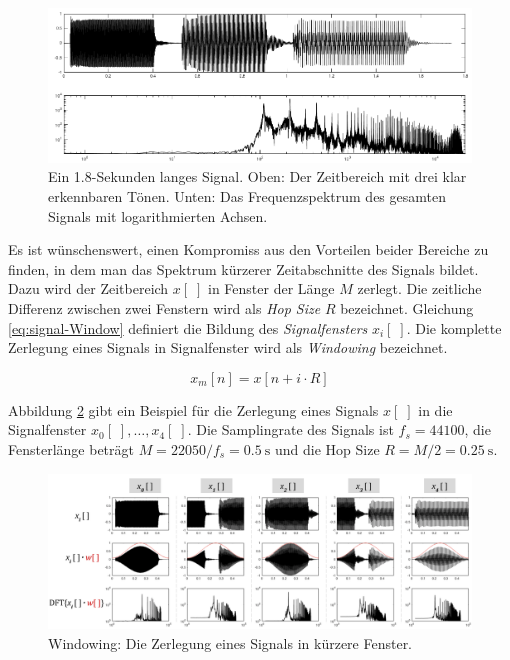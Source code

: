 \begin{figure}[h]
	\centering
	\includegraphics[width=1\textwidth]{bilder/stft01.png}
	\caption[Beispiel für die DFT]{Ein 1.8-Sekunden langes Signal. Oben: Der Zeitbereich mit drei klar erkennbaren Tönen. Unten: Das Frequenzspektrum des gesamten Signals mit logarithmierten Achsen.}
	\label{img:stft01}
\end{figure}

Es ist wünschenswert, einen Kompromiss aus den Vorteilen beider Bereiche zu finden, in dem man das Spektrum kürzerer Zeitabschnitte des Signals bildet. Dazu wird der Zeitbereich $x[\;]$ in Fenster der Länge $M$ zerlegt. Die zeitliche Differenz zwischen zwei Fenstern wird als \emph{Hop Size} $R$ bezeichnet. Gleichung \ref{eq:signal-Window} definiert die Bildung des \emph{Signalfensters} $x_i[\;]$. Die komplette Zerlegung eines Signals in Signalfenster wird als \emph{Windowing} bezeichnet.\cite{juliusSmith}

\begin{equation}
x_{m}[n] = x[n+i\cdot R]
\label{eq:signal-Window}
\end{equation}

Abbildung \ref{img:siganlWindows} gibt ein Beispiel für die Zerlegung eines Signals $x[\;]$ in die Signalfenster $x_0[\;] ,\ldots, x_4[\;]$. Die Samplingrate des Signals ist $f_s = 44100$, die Fensterlänge beträgt $M = 22050 / f_s = \SI{0.5}{\second}$ und die Hop Size $R = M / 2= \SI{0.25}{\second}$.

\begin{figure}[h]
	\centering
	\includegraphics[width=1\textwidth]{bilder/signalWindows03.png}
	\caption{Windowing: Die Zerlegung eines Signals in kürzere Fenster.}
	\label{img:siganlWindows}
\end{figure}

